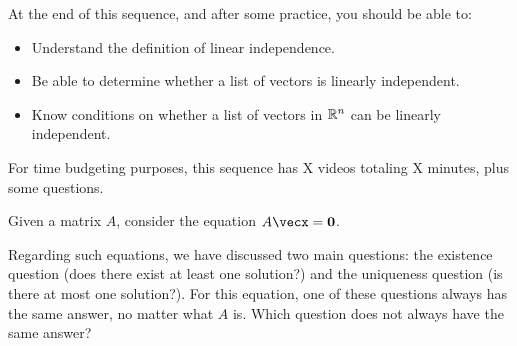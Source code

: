







At the end of this sequence, and after some practice, you should be able to:

\begin{itemize}
\item Understand the definition of linear independence.  
\item Be able to determine whether a list of vectors is linearly independent. 
\item Know conditions on whether a list of vectors in $\mathbb R^n$ can be linearly independent.
\end{itemize}


For time budgeting purposes, this sequence has X videos totaling X minutes, 
plus some questions.  




\endedxtext

\endedxvertical





Given a matrix $A$, consider the equation $A\vecx = \veco$.   

Regarding such equations, we have discussed two main questions: the existence question
(does there exist at least one solution?) and the uniqueness question (is there at most one
solution?).  For this equation, one of these questions always has the same answer, no matter
what $A$ is.  Which question does not always have the same answer?  



\endedxproblem





